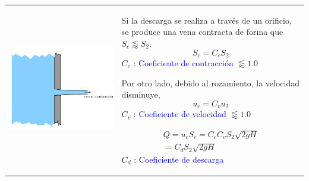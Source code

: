	\begin{tabular}{l>{\raggedright}p{}}
		\begin{minipage}[c]{0.4\textwidth}%
			\begin{center}
				\includegraphics[width=\linewidth]{TeX_files/chapter04-Dinamica/orificio}
			\end{center}
		\end{minipage} & %
		\begin{minipage}[c]{0.6\textwidth}%
			Si la descarga se realiza a través de un orificio, se produce una
			vena contracta de forma que $S_{c}\lessapprox S_{2}$. 
			\[
			S_{c}=C_{c}S_{2}
			\]
			$C_{c}$ : \textcolor{blue}{Coeficiente de contracción} $\lessapprox1.0$
			
			Por otro lado, debido al rozamiento, la velocidad disminuye, 
			\[
			u_{c}=C_{v}u_{2}
			\]
			$C_{v}$ : \textcolor{blue}{Coeficiente de velocidad} $\lessapprox1.0$
			
			\begin{align*}
				Q=u_{c}S_{c}=C_{c}C_{v}S_{2}\sqrt{2gH}\\
				=C_{d}S_{2}\sqrt{2gH}
			\end{align*}
			$C_{d}$ : \textcolor{blue}{Coeficiente de descarga} %
		\end{minipage}\tabularnewline
	\end{tabular}

	
